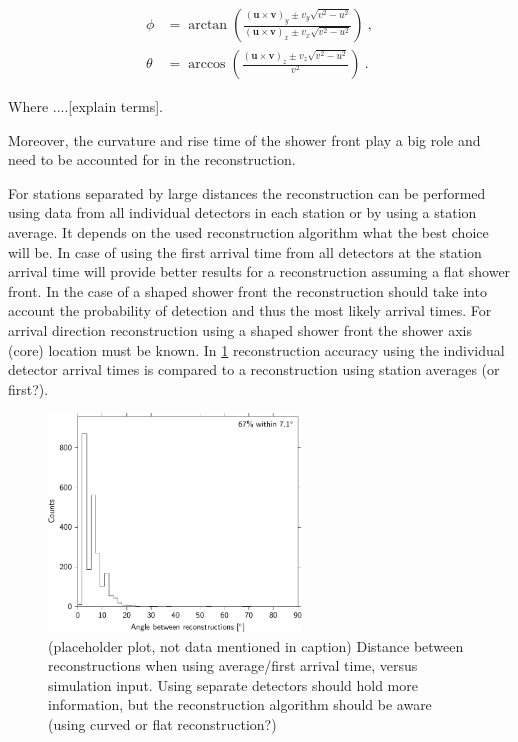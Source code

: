 \begin{equation}
    \label{eq:direction3dflat}
    \begin{split}
        \phi &= \arctan \left(\frac{(\mathbf{u} \times \mathbf{v})_y \pm v_y \sqrt{v^2-u^2}}{(\mathbf{u} \times \mathbf{v})_x \pm v_x \sqrt{v^2-u^2}}\right) \ , \\
        \theta & = \arccos \left( \frac{(\mathbf{u} \times \mathbf{v})_z \pm v_z \sqrt{v^2-u^2}}{v^2}\right) \ .
    \end{split}
\end{equation}

Where ....[explain terms].

Moreover, the curvature and rise time of the shower front play a big role and need to be accounted for in the reconstruction.

For stations separated by large distances the reconstruction can be performed using data from all individual detectors in each station or by using a station average. It depends on the used reconstruction algorithm what the best choice will be. In case of using the first arrival time from all detectors at the station arrival time will provide better results for a reconstruction assuming a flat shower front. In the case of a shaped shower front the reconstruction should take into account the probability of detection and thus the most likely arrival times. For arrival direction reconstruction using a shaped shower front the shower axis (core) location must be known. In \cref{fig:angle_between_501_minn16_510} reconstruction accuracy using the individual detector arrival times is compared to a reconstruction using station averages (or first?).

\begin{figure}
    \centering
    \includegraphics[width=0.6\textwidth]
                    {plots/cluster/angle_between_501_minn16_510}
    \caption{(placeholder plot, not data mentioned in caption) Distance between reconstructions when using average/first arrival time, versus simulation input. Using separate detectors should hold more information, but the reconstruction algorithm should be aware (using curved or flat reconstruction?)}
    \label{fig:angle_between_501_minn16_510}
\end{figure}



